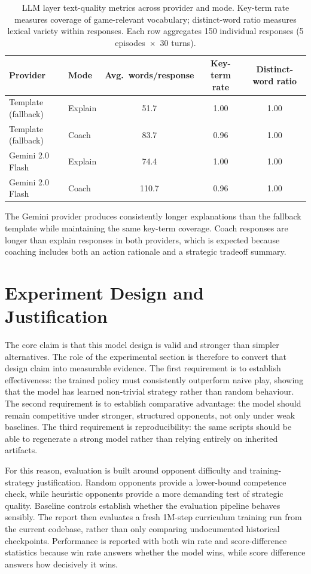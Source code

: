 \documentclass[10pt]{article}
\begin{document}
\begin{table}[H]
\centering
\begin{tabularx}{\textwidth}{@{}llccc@{}}
\toprule
Provider & Mode & Avg.\ words/response & Key-term rate & Distinct-word ratio \\
\midrule
Template (fallback) & Explain & 51.7 & 1.00 & 1.00 \\
Template (fallback) & Coach  & 83.7 & 0.96 & 1.00 \\
Gemini 2.0 Flash    & Explain & 74.4 & 1.00 & 1.00 \\
Gemini 2.0 Flash    & Coach  & 110.7 & 0.96 & 1.00 \\
\bottomrule
\end{tabularx}
\caption{LLM layer text-quality metrics across provider and mode. Key-term rate measures coverage of game-relevant vocabulary; distinct-word ratio measures lexical variety within responses. Each row aggregates 150 individual responses (5 episodes~$\times$~30 turns).}
\label{tab:llm-metrics}
\end{table}

The Gemini provider produces consistently longer explanations than the fallback template while maintaining the same key-term coverage. Coach responses are longer than explain responses in both providers, which is expected because coaching includes both an action rationale and a strategic tradeoff summary.

\section{Experiment Design and Justification}

The core claim is that this model design is valid and stronger than simpler alternatives. The role of the experimental section is therefore to convert that design claim into measurable evidence. The first requirement is to establish effectiveness: the trained policy must consistently outperform naive play, showing that the model has learned non-trivial strategy rather than random behaviour. The second requirement is to establish comparative advantage: the model should remain competitive under stronger, structured opponents, not only under weak baselines. The third requirement is reproducibility: the same scripts should be able to regenerate a strong model rather than relying entirely on inherited artifacts.

For this reason, evaluation is built around opponent difficulty and training-strategy justification. Random opponents provide a lower-bound competence check, while heuristic opponents provide a more demanding test of strategic quality. Baseline controls establish whether the evaluation pipeline behaves sensibly. The report then evaluates a fresh 1M-step curriculum training run from the current codebase, rather than only comparing undocumented historical checkpoints. Performance is reported with both win rate and score-difference statistics because win rate answers whether the model wins, while score difference answers how decisively it wins.
\end{document}
